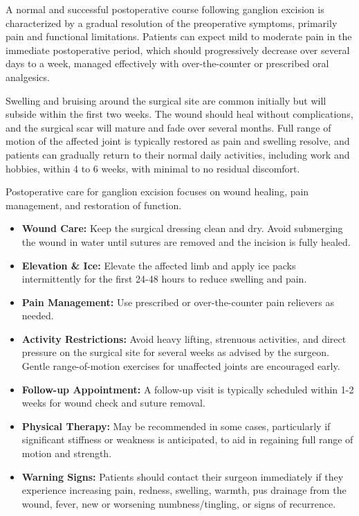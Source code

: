 A normal and successful postoperative course following ganglion excision is characterized by a gradual resolution of the preoperative symptoms, primarily pain and functional limitations. Patients can expect mild to moderate pain in the immediate postoperative period, which should progressively decrease over several days to a week, managed effectively with over-the-counter or prescribed oral analgesics. 

Swelling and bruising around the surgical site are common initially but will subside within the first two weeks. The wound should heal without complications, and the surgical scar will mature and fade over several months. Full range of motion of the affected joint is typically restored as pain and swelling resolve, and patients can gradually return to their normal daily activities, including work and hobbies, within 4 to 6 weeks, with minimal to no residual discomfort.

Postoperative care for ganglion excision focuses on wound healing, pain management, and restoration of function.

\begin{itemize}
  \item \textbf{Wound Care:} Keep the surgical dressing clean and dry. Avoid submerging the wound in water until sutures are removed and the incision is fully healed.
  
  \item \textbf{Elevation \& Ice:} Elevate the affected limb and apply ice packs intermittently for the first 24-48 hours to reduce swelling and pain.
  
  \item \textbf{Pain Management:} Use prescribed or over-the-counter pain relievers as needed.
  
  \item \textbf{Activity Restrictions:} Avoid heavy lifting, strenuous activities, and direct pressure on the surgical site for several weeks as advised by the surgeon. Gentle range-of-motion exercises for unaffected joints are encouraged early.
  
  \item \textbf{Follow-up Appointment:} A follow-up visit is typically scheduled within 1-2 weeks for wound check and suture removal.
  
  \item \textbf{Physical Therapy:} May be recommended in some cases, particularly if significant stiffness or weakness is anticipated, to aid in regaining full range of motion and strength.
  
  \item \textbf{Warning Signs:} Patients should contact their surgeon immediately if they experience increasing pain, redness, swelling, warmth, pus drainage from the wound, fever, new or worsening numbness/tingling, or signs of recurrence.
\end{itemize}

